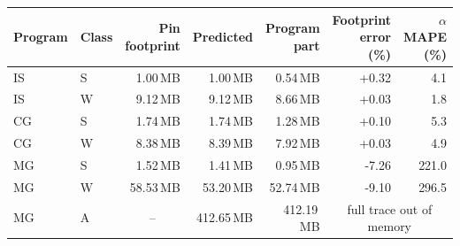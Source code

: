 \begin{tabular}{llrrrrr}
\toprule
Program & Class & Pin footprint & Predicted & Program part & Footprint error (\%) & $\alpha$ MAPE (\%) \\
\midrule
IS & S & 1.00\,MB & 1.00\,MB & 0.54\,MB & +0.32 & 4.1 \\
IS & W & 9.12\,MB & 9.12\,MB & 8.66\,MB & +0.03 & 1.8 \\
CG & S & 1.74\,MB & 1.74\,MB & 1.28\,MB & +0.10 & 5.3 \\
CG & W & 8.38\,MB & 8.39\,MB & 7.92\,MB & +0.03 & 4.9 \\
MG & S & 1.52\,MB & 1.41\,MB & 0.95\,MB & -7.26 & 221.0 \\
MG & W & 58.53\,MB & 53.20\,MB & 52.74\,MB & -9.10 & 296.5 \\
MG & A & \multicolumn{1}{c}{--} & 412.65\,MB & 412.19\,MB & \multicolumn{2}{c}{full trace out of memory} \\
\bottomrule
\end{tabular}
